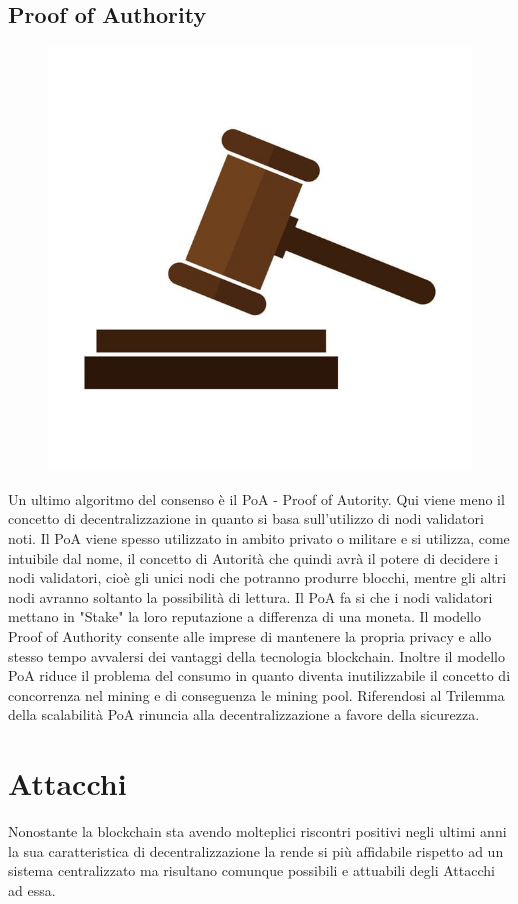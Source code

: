 \documentclass[12pt]{report}
\begin{document}
\subsection{Proof of Authority}
\begin{figure}[h]
	\includegraphics[height=.4\textheight]{judge}
\end{figure}
Un ultimo algoritmo del consenso è il PoA - Proof of Autority. Qui viene meno il concetto di decentralizzazione in quanto si basa sull'utilizzo di nodi validatori noti. Il PoA viene spesso utilizzato in ambito privato o militare e si utilizza, come intuibile dal nome, il concetto di Autorità che quindi avrà il potere di decidere i nodi validatori, cioè gli unici nodi che potranno produrre blocchi, mentre gli altri nodi avranno soltanto la possibilità di lettura. Il PoA fa si che i nodi validatori mettano in "Stake" la loro reputazione a differenza di una moneta. Il modello Proof of Authority consente alle imprese di mantenere la propria privacy e allo stesso tempo avvalersi dei vantaggi della tecnologia blockchain. Inoltre il modello PoA riduce il problema del consumo in quanto diventa inutilizzabile il concetto di concorrenza nel mining e di conseguenza le mining pool. Riferendosi al Trilemma della scalabilità PoA rinuncia alla decentralizzazione a favore della sicurezza.

\section{Attacchi}
Nonostante la blockchain sta avendo molteplici riscontri positivi negli ultimi anni la sua caratteristica di decentralizzazione la rende si più affidabile rispetto ad un sistema centralizzato ma risultano comunque possibili e attuabili degli Attacchi ad essa.
\end{document}
